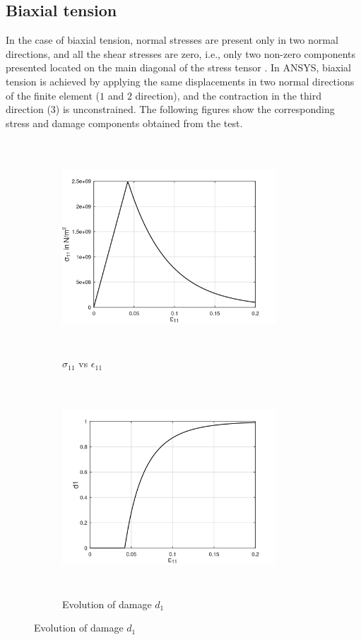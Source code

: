 \documentclass[12pt,a4paper,twoside,openright]{report}
\begin{document}
\subsection{Biaxial tension}
\indent\indent\indent  In the case of biaxial tension, normal stresses are present only in two normal directions, and all the shear stresses are zero, i.e., only two non-zero components presented located on the main diagonal of the stress tensor \citep{ubt}. In ANSYS, biaxial tension is achieved by applying the same displacements in two normal directions of the finite element ($1$ and $2$ direction), and the contraction in the third direction ($3$) is unconstrained. The following figures show the corresponding stress and damage components obtained from the test.\\
\begin{figure}[hbt!]
     \captionsetup[subfigure]{justification=centering}
     \begin{subfigure}{0.4\textwidth}
         \includegraphics[width=8cm,height=8cm,keepaspectratio]{23.S11vsE11.png}
         \caption{$\sigma_{11}$ vs $\epsilon_{11}$}
         \label{fig:S11vsE11}
     \end{subfigure}
	\hspace{1.5cm}
     \captionsetup[subfigure]{justification=centering}
     \begin{subfigure}{0.4\textwidth}
         \includegraphics[width=8cm,height=8cm,keepaspectratio]{23.d1.png}
         \caption{Evolution of damage $d_{1}$}
         \label{fig:Evolution of damage d1}
     \end{subfigure}
\end{figure}
\end{document}
